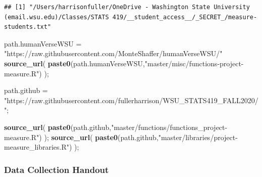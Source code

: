 \documentclass[]{article}
\newenvironment{Shaded}{\begin{snugshade}}{\end{snugshade}}
\newcommand{\KeywordTok}[1]{\textcolor[rgb]{0.13,0.29,0.53}{\textbf{#1}}}
\newcommand{\NormalTok}[1]{#1}
\newcommand{\StringTok}[1]{\textcolor[rgb]{0.31,0.60,0.02}{#1}}
\begin{document}
\begin{verbatim}
## [1] "/Users/harrisonfuller/OneDrive - Washington State University (email.wsu.edu)/Classes/STATS 419/__student_access__/_SECRET_/measure-students.txt"
\end{verbatim}

\begin{Shaded}
\begin{Highlighting}[]
\NormalTok{path.humanVerseWSU =}\StringTok{ "https://raw.githubusercontent.com/MonteShaffer/humanVerseWSU/"}
\KeywordTok{source_url}\NormalTok{( }\KeywordTok{paste0}\NormalTok{(path.humanVerseWSU,}\StringTok{"master/misc/functions-project-measure.R"}\NormalTok{) );}


\NormalTok{path.github =}\StringTok{ "https://raw.githubusercontent.com/fullerharrison/WSU_STATS419_FALL2020/"}\NormalTok{;}


\KeywordTok{source_url}\NormalTok{( }\KeywordTok{paste0}\NormalTok{(path.github,}\StringTok{"master/functions/functions_project-measure.R"}\NormalTok{) );}
\KeywordTok{source_url}\NormalTok{( }\KeywordTok{paste0}\NormalTok{(path.github,}\StringTok{"master/libraries/project-measure_libraries.R"}\NormalTok{) );}
\end{Highlighting}
\end{Shaded}

\newpage

\subsubsection{Data Collection Handout}
\label{sec:appendix-data-handout}
\end{document}
